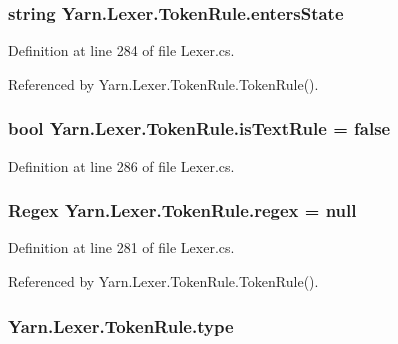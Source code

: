 \hypertarget{a00178_af6a4bd3416c4e1b8e56f9db461d52d18}{
\subsubsection[{enters\-State}]{\setlength{\rightskip}{0pt plus 5cm}string Yarn.\-Lexer.\-Token\-Rule.\-enters\-State}}\label{a00178_af6a4bd3416c4e1b8e56f9db461d52d18}


Definition at line 284 of file Lexer.\-cs.



Referenced by Yarn.\-Lexer.\-Token\-Rule.\-Token\-Rule().

\hypertarget{a00178_a09f49e6edf9ace38a92d723998181f8f}{
\subsubsection[{is\-Text\-Rule}]{\setlength{\rightskip}{0pt plus 5cm}bool Yarn.\-Lexer.\-Token\-Rule.\-is\-Text\-Rule = false}}\label{a00178_a09f49e6edf9ace38a92d723998181f8f}


Definition at line 286 of file Lexer.\-cs.

\hypertarget{a00178_a47a404d6637fae489c3c77729a01cc69}{
\subsubsection[{regex}]{\setlength{\rightskip}{0pt plus 5cm}Regex Yarn.\-Lexer.\-Token\-Rule.\-regex = null}}\label{a00178_a47a404d6637fae489c3c77729a01cc69}


Definition at line 281 of file Lexer.\-cs.



Referenced by Yarn.\-Lexer.\-Token\-Rule.\-Token\-Rule().

\hypertarget{a00178_a0de6fac3b55cf0c61e07cea53ce67caa}{
\subsubsection[{type}]{ Yarn.\-Lexer.\-Token\-Rule.\-type}}\label{a00178_a0de6fac3b55cf0c61e07cea53ce67caa}


